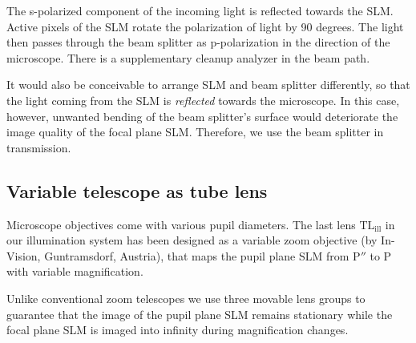 The s-polarized component of the incoming light is reflected towards
the SLM. Active pixels of the SLM rotate the polarization of light by
90 degrees. The light then passes through the beam splitter as
p-polarization in the direction of the microscope. There is a
supplementary cleanup analyzer in the beam path.

It would also be conceivable to arrange SLM and beam splitter
differently, so that the light coming from the SLM is \emph{reflected}
towards the microscope. In this case, however, unwanted bending of the
beam splitter's surface would deteriorate the image quality of the
focal plane SLM. Therefore, we use the beam splitter in transmission.



 	
	  	

\subsection{ Variable telescope as tube lens}
Microscope objectives come with various pupil diameters. The last lens
$\textrm{TL}_\textrm{ill}$ in our illumination system has been
designed as a variable zoom objective (by In-Vision, Guntramsdorf,
Austria), that maps the pupil plane SLM from $\textrm{P}''$ to
$\textrm{P}$ with variable magnification.

Unlike conventional zoom telescopes we use three movable lens groups
to guarantee that the image of the pupil plane SLM remains stationary
while the focal plane SLM is imaged into infinity during magnification
changes.




